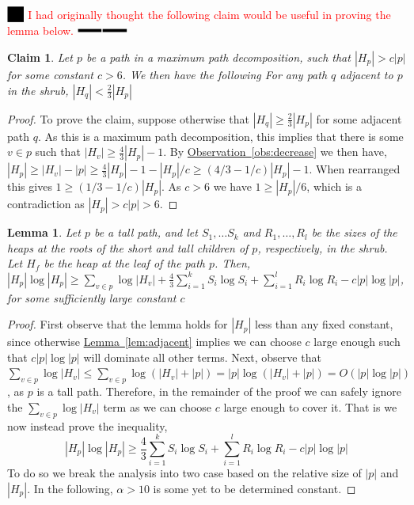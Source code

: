 \documentclass[11pt]{article}
\newtheorem{lemma}[theorem]{Lemma}
\newtheorem{claim}[theorem]{Claim}
\theoremstyle{definition}
\newcommand{\Lem}[1]{\hyperref[lem:#1]{Lemma~\ref*{lem:#1}}} %
\newcommand{\Obs}[1]{\hyperref[obs:#1]{Observation~\ref*{obs:#1}}} %
\newcommand{\XSays}[2]{{
      {$\rule[-0.12cm]{0.2in}{0.5cm}$\fbox{\tt
            #1:} }
      \textcolor{red}{#2}
      \marginpar{\textcolor{blue}{#1}}
      {$\rule[0.1cm]{0.3in}{0.1cm}$\fbox{\tt
            end}$\rule[0.1cm]{0.3in}{0.1cm}$}
      }
   }
\newcommand{\Ben}[1]{{\XSays{Ben}{#1}}}
\begin{document}
{\Ben{I had originally thought the following claim would be useful in proving the lemma below.}
\begin{claim}
\label{clm:sizes}
 Let $p$ be a path in a maximum path decomposition, such that $|H_p|>c|p|$ for some constant $c> 6$.
 We then have the following
  For any path $q$ adjacent to $p$ in the shrub, $|H_q|<\frac{2}{3}|H_p|$
\end{claim}
\begin{proof}
  To prove the claim, suppose otherwise that $|H_q|\geq \frac{2}{3}|H_p|$ for some 
  adjacent path $q$.  As this is a maximum path decomposition, this implies that there is some 
  $v\in p$ such that $|H_v|\geq \frac{4}{3}|H_p|-1$.
  By \Obs{decrease} we then have, 
   $|H_p| \geq |H_v| - |p|\geq \frac{4}{3}|H_p| - 1 - |H_p|/c \geq (4/3-1/c)|H_p|-1$.
  When rearranged this gives $1\geq (1/3-1/c)|H_p|$.  As $c>6$ we have $1\geq |H_p|/6$, 
  which is a contradiction as $|H_p|>c|p|>6$.  
\end{proof}

\begin{lemma}
\label{lem:excess}
 Let $p$ be a tall path, and let $S_1, \dots S_k$ and $R_1, \dots, R_l$ be the sizes of the heaps at the roots of the short and tall children of $p$, respectively, in the shrub.  
 Let $H_f$ be the heap at the leaf of the path $p$.
 Then,  $|H_p| \log |H_p|   \geq  \sum_{v\in p} \log|H_v| + \frac{4}{3}\sum_{i=1}^k S_i \log S_i + \sum_{i=1}^l R_i \log R_i  -  c|p|\log |p|$, for some sufficiently large constant $c$
 \end{lemma}
\begin{proof}
 First observe that the lemma holds for $|H_p|$ less than any fixed constant, since otherwise \Lem{adjacent} implies we can choose $c$ 
 large enough such that $c|p|\log|p|$ will dominate all other terms.
 Next, observe that $\sum_{v\in p} \log|H_v| \leq \sum_{v\in p} \log(|H_v|+|p|) = |p|\log(|H_v|+|p|) = O(|p|\log|p|)$, as $p$ is a tall path.  
 Therefore, in the remainder of the proof  we can safely ignore the $\sum_{v\in p} \log|H_v|$ term as we can choose $c$ large enough to cover it.  
 That is we now instead prove the inequality,
 \[
  |H_p| \log |H_p|   \geq \frac{4}{3}\sum_{i=1}^k S_i \log S_i + \sum_{i=1}^l R_i \log R_i  -  c|p|\log |p|
 \]
 To do so we  break the analysis into two case based on the relative size of $|p|$ and $|H_p|$. 
 In the following, $\alpha>10$ is some yet to be determined constant.  


\end{proof}}
\end{document}
